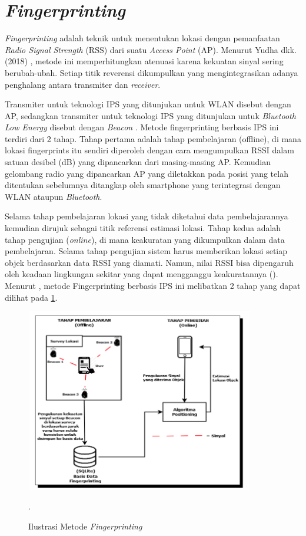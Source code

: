 \section{\textit{Fingerprinting}}
\textit{Fingerprinting} adalah teknik untuk menentukan lokasi dengan pemanfaatan \textit{Radio Signal Strength} (RSS) dari suatu \textit{Access Point }(AP). Menurut Yudha dkk. (2018) , metode ini memperhitungkan atenuasi karena kekuatan sinyal sering berubah-ubah. Setiap titik reverensi dikumpulkan yang mengintegrasikan adanya penghalang antara transmiter dan \textit{receiver}.

\par Transmiter untuk teknologi IPS yang ditunjukan untuk WLAN disebut dengan AP, sedangkan transmiter untuk teknologi IPS yang ditunjukan untuk \textit{Bluetooth Low Energy} disebut dengan \textit{Beacon } \cite{puspitasari2020}. Metode fingerprinting berbasis IPS ini terdiri dari 2 tahap. Tahap pertama adalah tahap pembelajaran (offline), di mana lokasi fingerprints itu sendiri diperoleh dengan cara mengumpulkan RSSI dalam satuan desibel (dB) yang dipancarkan dari masing-masing AP. Kemudian gelombang radio yang dipancarkan AP yang diletakkan pada posisi yang telah ditentukan sebelumnya ditangkap oleh smartphone yang terintegrasi dengan WLAN ataupun \textit{Bluetooth}.

\par Selama tahap pembelajaran lokasi yang tidak diketahui data pembelajarannya kemudian dirujuk sebagai titik referensi estimasi lokasi. Tahap kedua adalah tahap pengujian (\textit{online}), di mana keakuratan yang dikumpulkan dalam data pembelajaran. Selama tahap pengujian sistem harus memberikan lokasi setiap objek berdasarkan data RSSI yang diamati. Namun, nilai RSSI bisa dipengaruh oleh keadaan lingkungan sekitar yang dapat mengganggu keakuratannya (\citep{subhan2011indoor}). Menurut \citep{yudha2018indoor}, metode Fingerprinting berbasis IPS ini melibatkan 2 tahap yang dapat dilihat pada \ref{img:fingerprinting}.

\begin{figure}[H]
\centering
\shadowbox
{\includegraphics [width = 10cm, height= 8cm]{gambar/bab2/Fingerprinting}}
\caption{Ilustrasi Metode \textit{Fingerprinting} \citep{yudha2018indoor}}.
\label{img:fingerprinting}
\end{figure}

